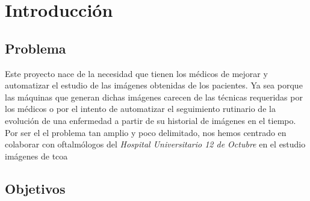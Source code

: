 \chapter{Introducción}
\section{Problema}
Este proyecto nace de la necesidad que tienen los médicos de mejorar y
automatizar el estudio de las imágenes obtenidas de los pacientes. Ya
sea porque las máquinas que generan dichas imágenes carecen de las
técnicas requeridas por los médicos o por el intento de automatizar el
seguimiento rutinario de la evolución de una enfermedad a partir de su
historial de imágenes en el tiempo. \\
Por ser el el problema tan amplio y poco delimitado, nos hemos
centrado en colaborar con oftalmólogos del \emph{Hospital
  Universitario 12 de Octubre} en el estudio imágenes de \gls{tcoa}

\section{Objetivos}
